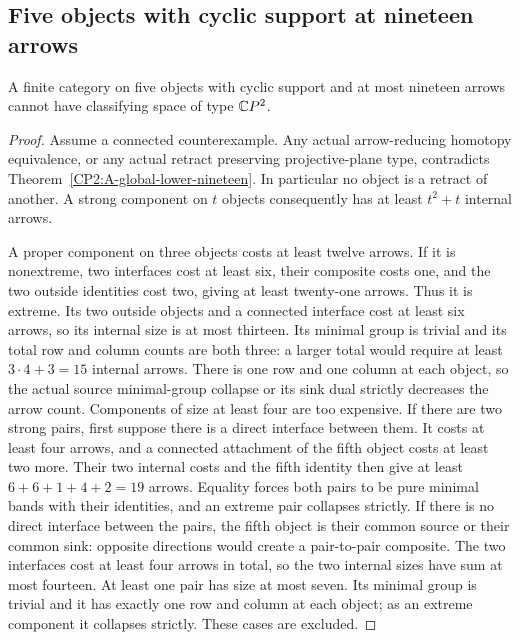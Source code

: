 \subsection{Five objects with cyclic support at nineteen arrows}

\begin{theorem}
\label{CP2:A-strong-five-nineteen}
A finite category on five objects with cyclic support and at most
nineteen arrows cannot have classifying space of type $\mathbb{C}P^2$.
\end{theorem}
\begin{proof}
Assume a connected counterexample. Any actual arrow-reducing
homotopy equivalence, or any actual retract preserving projective-plane
type, contradicts Theorem~\ref{CP2:A-global-lower-nineteen}.
In particular no object is a retract of another. A strong component
on $t$ objects consequently has at least $t^2+t$ internal arrows.

A proper component on three objects costs at least twelve arrows.
If it is nonextreme, two interfaces cost at least six, their composite
costs one, and the two outside identities cost two, giving at least
twenty-one arrows. Thus it is extreme. Its two outside objects and
a connected interface cost at least six arrows, so its internal size
is at most thirteen. Its minimal group is trivial and its total row
and column counts are both three: a larger total would require at
least $3\cdot4+3=15$ internal arrows. There is one row and one column
at each object, so the actual source minimal-group collapse or its
sink dual strictly decreases the arrow count. Components of size at
least four are too expensive. If there are two strong pairs, first suppose there is a direct
interface between them. It costs at least four arrows, and a connected
attachment of the fifth object costs at least two more. Their two
internal costs and the fifth identity then give at least
$6+6+1+4+2=19$ arrows. Equality forces both pairs to be pure minimal
bands with their identities, and an extreme pair collapses strictly.
If there is no direct interface between the pairs, the fifth object
is their common source or their common sink: opposite directions
would create a pair-to-pair composite. The two interfaces cost at
least four arrows in total, so the two internal sizes have sum at
most fourteen. At least one pair has size at most seven. Its minimal
group is trivial and it has exactly one row and column at each
object; as an extreme component it collapses strictly. These cases
are excluded.


\end{proof}
